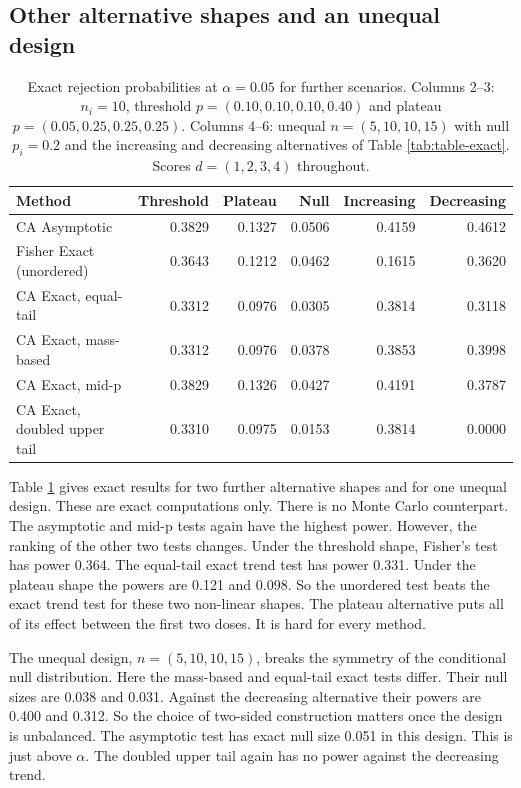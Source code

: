 \documentclass[
  11pt,
]{article}
\begin{document}
\subsection{Other alternative shapes and an unequal design}\label{other-alternative-shapes-and-an-unequal-design}

\begin{table}[!h]
\centering
\caption{\label{tab:exact-extra}Exact rejection probabilities at $\alpha = 0.05$ for further scenarios. Columns 2--3: $n_i = 10$, threshold $p = (0.10, 0.10, 0.10, 0.40)$ and plateau $p = (0.05, 0.25, 0.25, 0.25)$. Columns 4--6: unequal $n = (5, 10, 10, 15)$ with null $p_i = 0.2$ and the increasing and decreasing alternatives of Table \ref{tab:table-exact}. Scores $d = (1, 2, 3, 4)$ throughout.}
\centering
\fontsize{9}{11}\selectfont
\begin{tabular}[t]{lrrrrr}
\toprule
Method & Threshold & Plateau & Null & Increasing & Decreasing\\
\midrule
CA Asymptotic & 0.3829 & 0.1327 & 0.0506 & 0.4159 & 0.4612\\
Fisher Exact (unordered) & 0.3643 & 0.1212 & 0.0462 & 0.1615 & 0.3620\\
CA Exact, equal-tail & 0.3312 & 0.0976 & 0.0305 & 0.3814 & 0.3118\\
CA Exact, mass-based & 0.3312 & 0.0976 & 0.0378 & 0.3853 & 0.3998\\
CA Exact, mid-p & 0.3829 & 0.1326 & 0.0427 & 0.4191 & 0.3787\\
\addlinespace
CA Exact, doubled upper tail & 0.3310 & 0.0975 & 0.0153 & 0.3814 & 0.0000\\
\bottomrule
\end{tabular}
\end{table}

Table \ref{tab:exact-extra} gives exact results for two
further alternative shapes and for one unequal design.
These are exact computations only. There is no Monte
Carlo counterpart. The asymptotic and mid-p tests again
have the highest power. However, the ranking of the other
two tests changes. Under the threshold shape, Fisher's
test has power 0.364. The equal-tail
exact trend test has power 0.331.
Under the plateau shape the powers are
0.121 and
0.098. So the unordered test
beats the exact trend test for these two non-linear
shapes. The plateau alternative
puts all of its effect between the first two doses. It
is hard for every method.

The unequal design, \(n = (5, 10, 10, 15)\), breaks the
symmetry of the conditional null distribution. Here the
mass-based and equal-tail exact tests differ. Their null
sizes are 0.038 and
0.031. Against the decreasing
alternative their powers are 0.400
and 0.312. So the choice of
two-sided construction matters once the design is
unbalanced. The asymptotic test has exact null size
0.051 in this design. This is just
above \(\alpha\). The doubled upper tail again has no power
against the decreasing trend.
\end{document}
